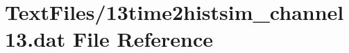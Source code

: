 \hypertarget{13time2histsim__channel13_8dat}{}\section{Text\+Files/13time2histsim\+\_\+channel13.dat File Reference}
\label{13time2histsim__channel13_8dat}
